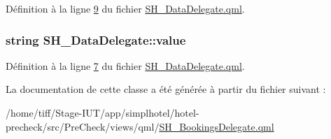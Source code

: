 Définition à la ligne \hyperlink{SH__DataDelegate_8qml_source_l00009}{9} du fichier \hyperlink{SH__DataDelegate_8qml_source}{S\-H\-\_\-\-Data\-Delegate.\-qml}.

\hypertarget{classSH__DataDelegate_acb9da3c73493c88865e08d9575f26482}{
\subsubsection[{value}]{\setlength{\rightskip}{0pt plus 5cm}string S\-H\-\_\-\-Data\-Delegate\-::value\hspace{0.3cm}{\ttfamily [inherited]}}}\label{classSH__DataDelegate_acb9da3c73493c88865e08d9575f26482}


Définition à la ligne \hyperlink{SH__DataDelegate_8qml_source_l00007}{7} du fichier \hyperlink{SH__DataDelegate_8qml_source}{S\-H\-\_\-\-Data\-Delegate.\-qml}.



La documentation de cette classe a été générée à partir du fichier suivant \-:\begin{DoxyCompactItemize}
\item 
/home/tiff/\-Stage-\/\-I\-U\-T/app/simplhotel/hotel-\/precheck/src/\-Pre\-Check/views/qml/\hyperlink{SH__BookingsDelegate_8qml}{S\-H\-\_\-\-Bookings\-Delegate.\-qml}\end{DoxyCompactItemize}
